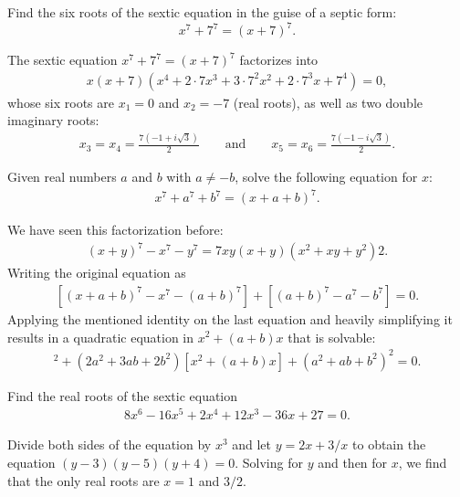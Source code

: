 \documentclass[12pt,a4paper]{memoir}
\theoremstyle{definition}
\begin{document}
\begin{question}
	Find the six roots of the sextic equation in the guise of a septic form: $$x^7+7^7=(x+7)^7.$$
\end{question}

\begin{solution}
	The sextic equation $x^7+7^7=(x+7)^7$ factorizes into
	\begin{align*}
		x(x+7)(x^4+2\cdot 7x^3 + 3 \cdot 7^2x^2 + 2 \cdot 7^3x + 7^4)=0,
	\end{align*}
	whose six roots are $x_1=0$ and $x_2=-7$ (real roots), as well as two double imaginary roots:
	\begin{align*}
		x_3=x_4=\frac{7(-1+i\sqrt 3)}{2} \qquad \text{and} \qquad x_5=x_6=\frac{7(-1-i\sqrt 3)}{2}.
	\end{align*}
\end{solution}

\begin{question}
	Given real numbers $a$ and $b$ with $a\neq -b$, solve the following equation for $x$:
	\begin{align*}
		x^7+a^7+b^7 = (x+a+b)^7.
	\end{align*}
\end{question}

\begin{solution}
	We have seen this factorization before:
	\begin{align*}
		(x+y)^7-x^7-y^7 = 7xy(x+y)(x^2+xy+y^2)2.
	\end{align*}
	Writing the original equation as
	\begin{align*}
		\left[(x+a+b)^7 - x^7 - (a+b)^7\right] + \left[(a+b)^7-a^7-b^7\right]=0.
	\end{align*}
	Applying the mentioned identity on the last equation and heavily simplifying it results in a quadratic equation in $x^2+(a+b)x$ that is solvable:
	\begin{align*}
		[x^2+(a+b)x]^2 + (2a^2+3ab+2b^2)[x^2+(a+b)x] + (a^2+ab+b^2)^2=0.
	\end{align*}
\end{solution}


\begin{question}
	Find the real roots of the sextic equation 
	\begin{align*}
		8x^6-16x^5+2x^4+12x^3-36x+27=0.
	\end{align*}
\end{question}

\begin{solution}
	Divide both sides of the equation by $x^3$ and let $y=2x+3/x$ to obtain the equation $(y-3)(y-5)(y+4)=0$. Solving for $y$ and then for $x$, we find that the only real roots are $x=1$ and $3/2$. 
\end{solution}
\end{document}
